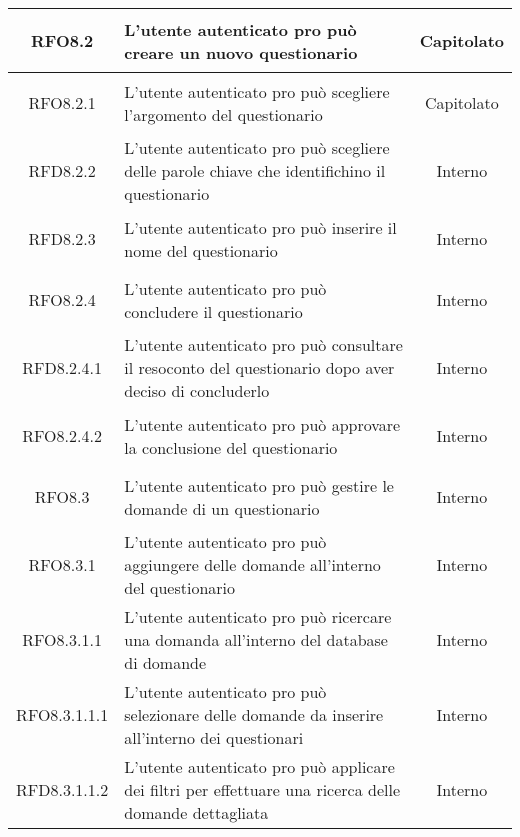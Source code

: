 \begin{longtable}{|c|>{\centering}m{7cm}|c|}
\hypertarget{RFO8.2}{RFO8.2} & L’utente autenticato pro può creare un nuovo questionario & Capitolato
\\ \hline

\hypertarget{RFO8.2.1}{RFO8.2.1} & L’utente autenticato pro può scegliere l’argomento del questionario & Capitolato
\\ \hline

\hypertarget{RFD8.2.2}{RFD8.2.2} & L’utente autenticato pro può scegliere delle parole chiave che identifichino il questionario & Interno
\\ \hline

\hypertarget{RFD8.2.3}{RFD8.2.3} & L’utente autenticato pro può inserire il nome del questionario & Interno
\\ \hline

\hypertarget{RFO8.2.4}{RFO8.2.4} & L’utente autenticato pro può concludere il questionario & Interno
\\ \hline

\hypertarget{RFD8.2.4.1}{RFD8.2.4.1} & L’utente autenticato pro può consultare il resoconto del questionario dopo aver deciso di concluderlo & Interno
\\ \hline

\hypertarget{RFO8.2.4.2}{RFO8.2.4.2} & L’utente autenticato pro può approvare la conclusione del questionario & Interno
\\ \hline

\hypertarget{RFO8.3}{RFO8.3} & L’utente autenticato pro può gestire le domande di un questionario & Interno
\\ \hline

\hypertarget{RFO8.3.1}{RFO8.3.1} & L’utente autenticato pro può aggiungere delle domande all’interno del questionario & Interno
\\ \hline

\hypertarget{RFO8.3.1.1}{RFO8.3.1.1} & L’utente autenticato pro può ricercare una domanda all’interno del database di domande & Interno
\\ \hline

\hypertarget{RFO8.3.1.1.1}{RFO8.3.1.1.1} & L’utente autenticato pro può selezionare delle domande da inserire all’interno dei questionari & Interno
\\ \hline

\hypertarget{RFD8.3.1.1.2}{RFD8.3.1.1.2} & L’utente autenticato pro può applicare dei filtri per effettuare una ricerca delle domande dettagliata & Interno
\\ \hline


\end{longtable}

